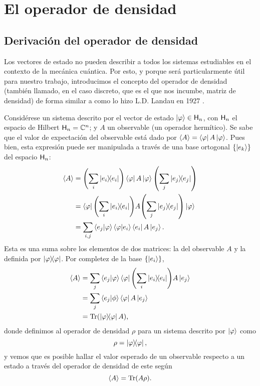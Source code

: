 \section{El operador de densidad}
\subsection{Derivación del operador de densidad}

Los vectores de estado no pueden describir a todos los sistemas estudiables en el contexto de la mecánica cuántica. Por esto, y porque será particularmente útil para nuestro trabajo, introducimos el concepto del operador de densidad (también llamado, en el caso discreto, que es el que nos incumbe, matriz de densidad) de forma similar a como lo hizo L.D. Landau en 1927 \cite{Landau}.

Considérese un sistema descrito por el vector de estado $\ket{\varphi}\in{\sf H}_{n}$, con ${\sf H}_{n}$ el espacio de Hilbert ${\sf H}_{n}=\mathbb{C}^{n}$; y $A$ un observable (un operador hermítico). Se sabe que el valor de expectación del observable está dado por $\expval{A}=\bra{\varphi}A\ket{\varphi}$. Pues bien, esta expresión puede ser manipulada a través de una base ortogonal $\{\ket{e_{k}}\}$ del espacio ${\sf H}_{n}$:
\begin{align*}
\expval{A}&=\qty(\sum_{i}\dyad{e_{i}})\bra{\varphi}A\ket{\varphi}\qty(\sum_{j}\dyad{e_{j}})\\
&=\bra{\varphi}\qty(\sum_{i}\dyad{e_{i}})A\qty(\sum_{j}\dyad{e_{j}})\ket{\varphi}\\
&=\sum_{i,j}\bra{e_{j}}\ket{\varphi}\bra{\varphi}\ket{e_{i}}\bra{e_{i}}A\ket{e_{j}}\rlap{.}\\
\end{align*}
Esta es una suma sobre los elementos de dos matrices: la del observable $A$ y la definida por $\dyad{\varphi}$. Por completez de la base $\{\ket{e_{i}}\}$,
\begin{align*}
\expval{A}&=\sum_{j}\bra{e_{j}}\ket{\varphi}\bra{\varphi}\qty(\sum_{i}\dyad{e_{i}})A\ket{e_{j}}\\
&=\sum_{j}\bra{e_{j}}\ket{\phi}\bra{\varphi}A\ket{e_{j}}\\
&=\Tr(\dyad{\varphi}A)\rlap{,}
\end{align*}
donde definimos al operador de densidad $\rho$ para un sistema descrito por $\ket{\varphi}$ como
\begin{equation}\label{eq:DensOpPure}
\rho=\dyad{\varphi},
\end{equation} 
y vemos que es posible hallar el valor esperado de un observable respecto a un estado a través del operador de densidad de este según
\begin{equation}\label{eq:ExpValFromDensOp}
\expval{A}=\Tr(A\rho).
\end{equation}

